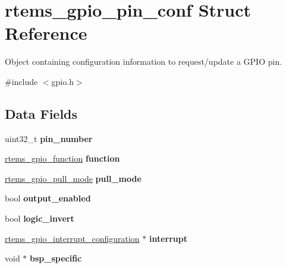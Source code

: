 \hypertarget{structrtems__gpio__pin__conf}{}\section{rtems\+\_\+gpio\+\_\+pin\+\_\+conf Struct Reference}
\label{structrtems__gpio__pin__conf}


Object containing configuration information to request/update a G\+P\+IO pin.  




{\ttfamily \#include $<$gpio.\+h$>$}

\subsection*{Data Fields}
\begin{DoxyCompactItemize}
\item 
\mbox{\label{structrtems__gpio__pin__conf_ade49d5601e9e5acffa155b0f674305f9}} 
uint32\+\_\+t {\bfseries pin\+\_\+number}
\item 
\mbox{\label{structrtems__gpio__pin__conf_afbe2099aa3712c52c05d6d4f7d325138}} 
\mbox{\hyperlink{gpio_8h_a0dec0f66d467b092b41dafe3d731a0d1}{rtems\+\_\+gpio\+\_\+function}} {\bfseries function}
\item 
\mbox{\label{structrtems__gpio__pin__conf_aa765d84e1ed697a2855cad5ac50f41a9}} 
\mbox{\hyperlink{gpio_8h_add28697559b41893e0754f35509bf835}{rtems\+\_\+gpio\+\_\+pull\+\_\+mode}} {\bfseries pull\+\_\+mode}
\item 
\mbox{\label{structrtems__gpio__pin__conf_a88b8cef23cfc17e4327b65905734e2b9}} 
bool {\bfseries output\+\_\+enabled}
\item 
\mbox{\label{structrtems__gpio__pin__conf_aebd643e954cd39237b365db38a8cb360}} 
bool {\bfseries logic\+\_\+invert}
\item 
\mbox{\label{structrtems__gpio__pin__conf_a259d4b4e602c60fc85e5253f16cc6295}} 
\mbox{\hyperlink{structrtems__gpio__interrupt__configuration}{rtems\+\_\+gpio\+\_\+interrupt\+\_\+configuration}} $\ast$ {\bfseries interrupt}
\item 
\mbox{\label{structrtems__gpio__pin__conf_abc7c6de08bdb5e0e4fe61505c71962cf}} 
void $\ast$ {\bfseries bsp\+\_\+specific}
\end{DoxyCompactItemize}



